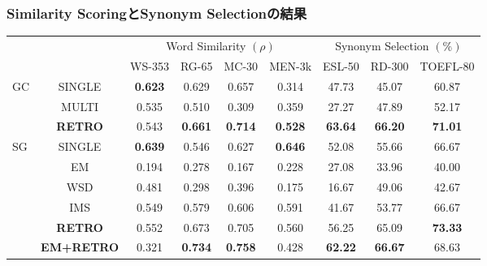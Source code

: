 \documentclass[10pt,hyperref={unicode}]{beamer}
\begin{document}
\begin{frame}
\frametitle{Similarity ScoringとSynonym Selectionの結果}
\begin{algfont}
    {\renewcommand{\arraystretch}{1.5}
        {\scriptsize
\begin{tabular}{cc|cccc|ccc|}
    \cline{3-9}
    & \multicolumn{1}{l|}{} & \multicolumn{4}{c|}{Word Similarity $(\rho)$} & \multicolumn{3}{c|}{Synonym Selection $(\%)$} \\
                                          &                      & WS-353    & RG-65    & MC-30   & MEN-3k   & ESL-50     & RD-300     & TOEFL-80    \\
\hline
\multicolumn{1}{|l|}{\multirow{3}{*}{GC}}
                        & SINGLE            & \textbf{0.623} & 0.629          & 0.657          & 0.314          & 47.73          & 45.07          & 60.87          \\
\multicolumn{1}{|l|}{}  & MULTI             & 0.535          & 0.510          & 0.309          & 0.359          & 27.27          & 47.89          & 52.17          \\
\multicolumn{1}{|l|}{}  & \textbf{RETRO}    & 0.543          & \textbf{0.661} & \textbf{0.714} & \textbf{0.528} & \textbf{63.64} & \textbf{66.20} & \textbf{71.01} \\
\hline
\multicolumn{1}{|l|}{\multirow{6}{*}{SG}}
                        & SINGLE            & \textbf{0.639} & 0.546          & 0.627          & \textbf{0.646} & 52.08          & 55.66          & 66.67          \\
\multicolumn{1}{|l|}{}  & EM                & 0.194          & 0.278          & 0.167          & 0.228          & 27.08          & 33.96          & 40.00          \\
\multicolumn{1}{|l|}{}  & WSD               & 0.481          & 0.298          & 0.396          & 0.175          & 16.67          & 49.06          & 42.67          \\
\multicolumn{1}{|l|}{}  & IMS               & 0.549          & 0.579          & 0.606          & 0.591          & 41.67          & 53.77          & 66.67          \\
\multicolumn{1}{|l|}{}  & \textbf{RETRO}    & 0.552          & 0.673          & 0.705          & 0.560          & 56.25          & 65.09          & \textbf{73.33} \\
\multicolumn{1}{|l|}{}  & \textbf{EM+RETRO} & 0.321          & \textbf{0.734} & \textbf{0.758} & 0.428          & \textbf{62.22} & \textbf{66.67} & 68.63          \\
\hline
\end{tabular}
        }
    }
\end{algfont}
\end{frame}
\end{document}
